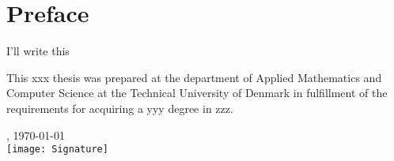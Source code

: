 \chapter{Preface}

I'll write this

This xxx thesis was prepared at the department of Applied Mathematics and Computer Science at the Technical University of Denmark in fulfillment of the requirements for acquiring a yyy degree in zzz.

\vfill

{
\centering
    \thesislocation{}, \today\\[1cm]
    \hspace{3cm}\texttt{[image: Signature]}\\[1cm]
\begin{flushright}
    \thesisauthor{}
\end{flushright}
}
